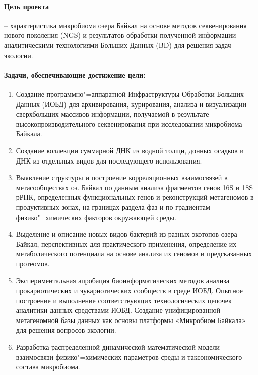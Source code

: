 \documentclass[a4paper,12pt,openany,final]{extreport}
\makeatletter
\def\vhrulefill#1{\leavevmode\leaders\hrule\@height#1\hfill \kern\z@}
\newcommand\toprule{\noindent\vhrulefill{2pt}}
\newcommand\bottomrule{\noindent\vhrulefill{2pt}}
\makeatother
\begin{document}
\paragraph{Цель проекта} \hspace{-1.5ex}-- характеристика микробиома озера Байкал на основе методов секвенирования нового поколения (NGS) и результатов обработки полученной информации аналитическими технологиями Больших Данных (BD) для решения задач экологии.

\paragraph{Задачи, обеспечивающие достижение цели:}
\begin{enumerate}
\item Создание программно"=аппаратной Инфраструктуры Обработки Больших Данных (ИОБД) для архивирования, курирования, анализа и визуализации сверхбольших массивов информации, получаемой в результате высокопроизводительного секвенирования при исследовании микробиома Байкала.

\item Создание коллекции суммарной ДНК из водной толщи, донных осадков и ДНК из отдельных видов для последующего использования.

\item Выявление структуры и построение корреляционных взаимосвязей в метасообществах оз. Байкал по данным анализа фрагментов генов 16S и 18S рРНК, определенных функциональных генов и реконструкций метагеномов в продуктивных зонах, на границах раздела фаз и по градиентам физико"=химических факторов окружающей среды.

\item Выделение и описание новых видов бактерий из разных экотопов озера Байкал, перспективных для практического применения, определение их метаболического потенциала на основе анализа их геномов и предсказанных протеомов.

\item Экспериментальная апробация биоинформатических методов анализа прокариотических и эукариотических сообществ в среде ИОБД. Опытное построение и выполнение соответствующих технологических цепочек аналитики данных средствами ИОБД. Создание унифицированной метагеномной базы данных как основы платформы «Микробиом Байкала» для решения вопросов экологии.

\item Разработка распределенной динамической математической модели взаимосвязи физико"=химических параметров среды и таксономического состава микробиома.\strut
\end{enumerate}
\clearpage{}
\end{document}
